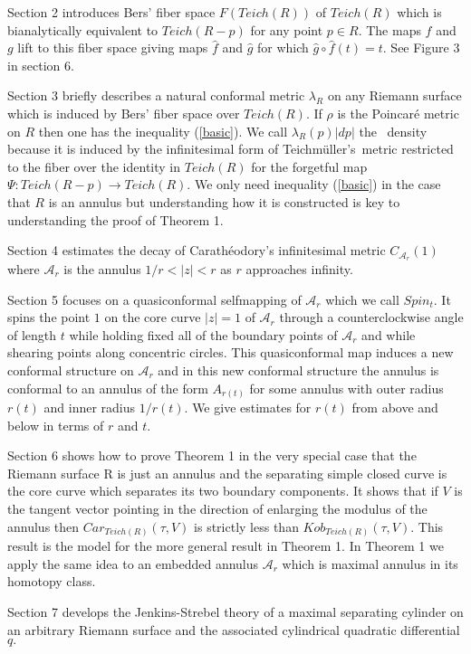 \documentclass[12pt]{amsart}
\newcommand{\tes}{Teich\-m\"ul\-ler's}
\theoremstyle{remark}
\newcommand{\Car}{Carath\'eodory}
\theoremstyle{definition}
\theoremstyle{definition}
\begin{document}
\begin{section}
Section 2 introduces Bers' fiber space $F(Teich(R))$ of $Teich(R)$ which is bianalytically 
equivalent to $Teich(R-p)$ for any point $ p \in R.$ The maps $f$ and $g$ lift to this fiber space giving 
maps $\hat{f}$ and $\hat{g}$ for which  $\hat{g} \circ \hat{f}(t) = t.$ 
See Figure 3 in section 6.

Section 3 briefly describes a natural conformal metric $\lambda_R$ on any Riemann surface  which is induced by Bers' fiber space  over $Teich(R).$ If $\rho$ is the Poincar\'e metric on $R$ then  one has the inequality (\ref{basic}).  We call $\lambda_R(p)|dp|$ the \te\ density because it is induced by the infinitesimal form of \tes\ metric restricted to the fiber over the identity in $Teich(R)$ for the forgetful map $\Psi: Teich(R-p) \rightarrow Teich(R).$ 
We only need  inequality (\ref{basic}) in the case that $R$ is an annulus but  
understanding how it is constructed is key to understanding the proof of Theorem 1. 

Section 4 estimates the decay of  \Car's infinitesimal metric $C_{{\mathcal A}_r}(1)$ where 
${\mathcal A}_r$ is the annulus $1/r<|z|<r$ as $r$ approaches infinity. 

Section 5  focuses on a quasiconformal selfmapping of ${\mathcal A}_r$ which we call $Spin_t.$ 
It spins the point $1$ on the core curve $|z|=1$ of ${\mathcal A}_r$ through a counterclockwise angle of length $t$
while holding fixed all of the boundary points of ${\mathcal A}_r$ and while shearing points along concentric circles. This quasiconformal map induces a new conformal structure on ${\mathcal A}_r$ and in this new conformal structure the annulus is conformal to an annulus of the form $A_{r(t)}$ for some annulus with outer radius $r(t)$ 
and inner radius $1/r(t).$  We give estimates for $r(t)$ from above and below in terms of $r$ and $t.$

Section 6 shows how to prove Theorem 1 in the very special case that the Riemann surface R is just an annulus and the separating simple closed curve is the core curve which separates its two boundary components.  It shows that if $V$ is the tangent vector pointing in the direction of enlarging the modulus of the annulus then
$Car_{Teich(R)}(\tau,V)$ is strictly less than $Kob_{Teich(R)}(\tau,V).$   This result is the model for the more general result in Theorem 1.  In Theorem 1 we apply the same idea to an embedded annulus ${\mathcal A}_r$ which is maximal annulus in its homotopy class.



Section 7 develops the Jenkins-Strebel theory of a maximal separating cylinder on an arbitrary Riemann surface and the associated cylindrical quadratic differential $q.$


\end{section}
\end{document}
